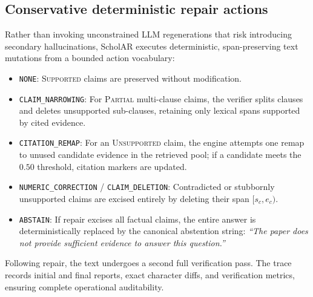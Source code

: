\subsection{Conservative deterministic repair actions}
Rather than invoking unconstrained LLM regenerations that risk introducing secondary hallucinations, ScholAR executes deterministic, span-preserving text mutations from a bounded action vocabulary:
\begin{itemize}
    \setlength{\itemsep}{0pt}\setlength{\parskip}{0pt}
    \item \texttt{NONE}: \textsc{Supported} claims are preserved without modification.
    \item \texttt{CLAIM\_}\allowbreak\texttt{NARROWING}: For \textsc{Partial} multi-clause claims, the verifier splits clauses and deletes unsupported sub-clauses, retaining only lexical spans supported by cited evidence.
    \item \texttt{CITATION\_}\allowbreak\texttt{REMAP}: For an \textsc{Unsupported} claim, the engine attempts one remap to unused candidate evidence in the retrieved pool; if a candidate meets the $0.50$ threshold, citation markers are updated.
    \item \texttt{NUMERIC\_}\allowbreak\texttt{CORRECTION} / \texttt{CLAIM\_}\allowbreak\texttt{DELETION}: Contradicted or stubbornly unsupported claims are excised entirely by deleting their span $[s_c, e_c)$.
    \item \texttt{ABSTAIN}: If repair excises all factual claims, the entire answer is deterministically replaced by the canonical abstention string: \emph{``The paper does not provide sufficient evidence to answer this question.''}
\end{itemize}

Following repair, the text undergoes a second full verification pass. The trace records initial and final reports, exact character diffs, and verification metrics, ensuring complete operational auditability.

